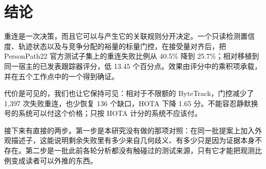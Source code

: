 \section{结论}

重连是一次决策，而且它可以与产生它的关联规则分开决定。一个只读检测置信度、轨迹状态以及与竞争分配的裕量的标量门控，在接受量对齐后，把 PersonPath22 官方测试子集上的重连失败比例从 40.5\% 降到 25.7\%；相对移植到同一宿主的已发表跟踪器评分，低 13.45 个百分点。效果由评分中的乘积项承载，并在五个工作点中的一个得到确证。

代价是可见的，我们也让它保持可见：相对于不限额的 ByteTrack，门控减少了 1,397 次失败重连，也少恢复 136 个缺口，HOTA 下降 1.65 分。不能容忍静默换号的系统可以付这个价格；只按 HOTA 计分的系统不应该付。

接下来有直接的两步。第一步是本研究没有做的那项对照：在同一批提案上加入外观描述子，这能说明剩余失败里有多少来自几何歧义、有多少只是因为证据本身不存在。第二步是一批此前各轮分析都没有触碰过的测试来源，只有它才能把观测比例变成读者可以外推的东西。
